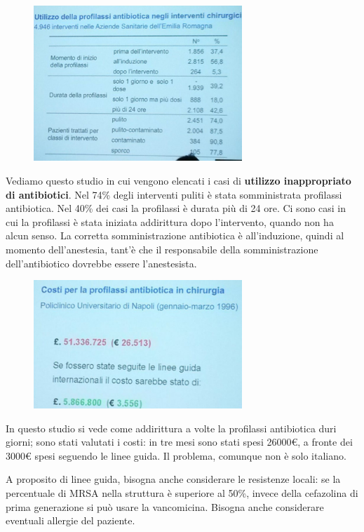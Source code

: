 \begin{figure}[!ht]
\centering
	\includegraphics[width=0.7\textwidth]{19/image8.jpeg}
	\end{figure}

Vediamo questo studio in cui vengono elencati i casi di \textbf{utilizzo
inappropriato di antibiotici}. Nel 74\% degli interventi puliti è stata
somministrata profilassi antibiotica. Nel 40\% dei casi la profilassi è
durata più di 24 ore. Ci sono casi in cui la profilassi è stata iniziata
addirittura dopo l'intervento, quando non ha alcun senso. La corretta
somministrazione antibiotica è all'induzione, quindi al momento
dell'anestesia, tant'è che il responsabile della somministrazione
dell'antibiotico dovrebbe essere l'anestesista.

\begin{figure}[!ht]
\centering
	\includegraphics[width=0.7\textwidth]{19/image9.jpeg}
	\end{figure}

In questo studio si vede come addirittura a volte la profilassi
antibiotica duri giorni; sono stati valutati i costi: in tre mesi sono
stati spesi 26000\euro{}, a fronte dei 3000\euro{} spesi seguendo le
linee guida. Il problema, comunque non è solo italiano.

A proposito di linee guida, bisogna anche considerare le resistenze
locali: se la percentuale di MRSA nella struttura è superiore al 50\%,
invece della cefazolina di prima generazione si può usare la
vancomicina. Bisogna anche considerare eventuali allergie del paziente.

